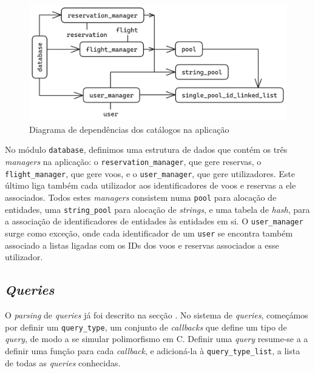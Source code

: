 \documentclass[12pt, a4paper]{article}
\begin{document}
\begin{figure}[h]
    \centering
    \includegraphics[scale=0.2]{res/database.png}
    \caption{Diagrama de dependências dos catálogos na aplicação}
    \label{fig:catalogs}
\end{figure}

No módulo \texttt{database}, definimos uma estrutura de dados que contém os três \emph{managers} na
aplicação: o \texttt{reservation\_manager}, que gere reservas, o \texttt{flight\_manager}, que gere
voos, e o \texttt{user\_manager}, que gere utilizadores. Este último liga também cada utilizador aos
identificadores de voos e reservas a ele associados. Todos estes \emph{managers} consistem numa
\texttt{pool} para alocação de entidades, uma \texttt{string\_pool} para alocação de \emph{strings},
e uma tabela de \emph{hash}, para a associação de identificadores de entidades às entidades em si.
O \texttt{user\_manager} surge como exceção, onde cada identificador de um \texttt{user} se
encontra também associado a listas ligadas com os IDs dos voos e reservas associados a esse
utilizador.

\subsection{\emph{Queries}}
\label{sec:queries}

O \emph{parsing} de \emph{queries} já foi descrito na secção . No sistema de
\emph{queries}, começámos por definir um \texttt{query\_type}, um conjunto de \emph{callbacks} que
define um tipo de \emph{query}, de modo a se simular polimorfismo em C. Definir uma \emph{query}
resume-se a a definir uma função para cada \emph{callback}, e adicioná-la à
\texttt{query\_type\_list}, a lista de todas as \emph{queries} conhecidas.
\end{document}
